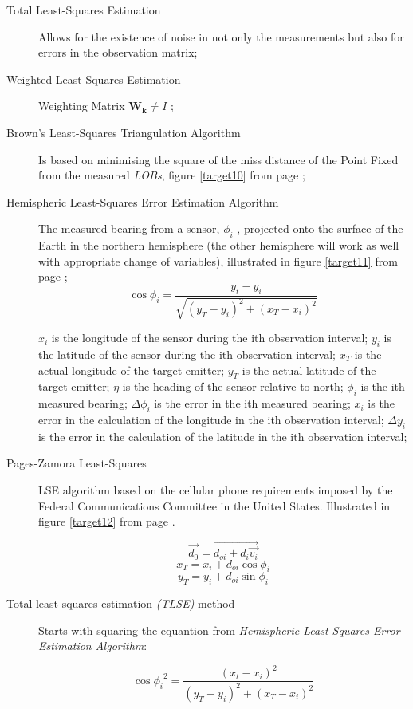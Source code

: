 \documentclass[english,purist]{ist-report}
\begin{document}
\begin{description}
    \item [Total Least-Squares Estimation] Allows for the existence of noise in not only the measurements but also for errors in the observation matrix;
    \item [Weighted Least-Squares Estimation] Weighting Matrix  $\mathbf{W_k}\neq I $ ;
    \item [Brown’s Least-Squares Triangulation Algorithm] Is based on minimising the square of the miss distance of the Point Fixed from the measured \textit{LOBs}, figure \ref{target10} from page \pageref{target10};
\item [Hemispheric Least-Squares Error Estimation Algorithm]
    
The measured bearing from a sensor, $\phi_i$ , projected onto
the surface of the Earth in the northern hemisphere (the other hemisphere will work as well with appropriate change of variables), illustrated in figure \ref{target11} from page \pageref{target11};
\begin{equation*}
    \cos{\phi_i}= \frac{y_t - y_i}{\sqrt{(y_T - y_i)^2+(x_T - x_i)^2}}
\end{equation*}

$x_i$ is the longitude of the sensor during the ith observation interval;
$y_i$ is the latitude of the sensor during the ith observation interval;
$x_T$ is the actual longitude of the target emitter;
$y_T$ is the actual latitude of the target emitter;
$\eta$ is the heading of the sensor relative to north;
$\phi_i$ is the ith measured bearing;
$\Delta \phi_i$ is the error in the ith measured bearing;
$x_i$ is the error in the calculation of the longitude in the ith observation interval;
$\Delta y_i$ is the error in the calculation of the latitude in the ith observation interval; 

\item [Pages-Zamora Least-Squares] LSE algorithm based on the
cellular phone requirements imposed by the Federal Communications Committee in the United States. Illustrated in figure \ref{target12} from page \pageref{target12}.  

\begin{equation*}
    \Vec{d_0}= \Vec{d_{oi}+ d_i\Vec{v_i}} 
\end{equation*}
\begin{equation*}
    x_T = x_i + d_{oi}\cos{\phi_i}
\end{equation*}
\begin{equation*}
    y_T = y_i + d_{oi}\sin{\phi_i}
\end{equation*}


\item [Total least-squares estimation \textit{(TLSE)} method] Starts with squaring the equantion from \textit{Hemispheric Least-Squares Error Estimation Algorithm}:

\begin{equation*}
    \cos{\phi_i}^2= \frac{(x_t - x_i)^2}{(y_T - y_i)^2+(x_T - x_i)^2}
\end{equation*}


\end{description}
\end{document}

